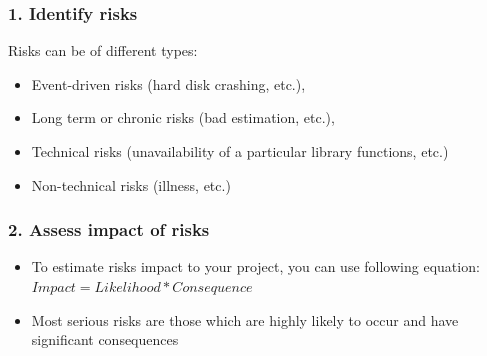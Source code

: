 \begin{frame}[t]\frametitle{1. Identify risks}
Risks can be of different types:
    \begin{itemize}
    	\item Event-driven risks (hard disk crashing, etc.),
        \item Long term or chronic risks (bad estimation, etc.),
        \item Technical risks (unavailability of a particular library functions, etc.)
        \item Non-technical risks (illness, etc.)
    \end{itemize}
\end{frame}

\begin{frame}[t]\frametitle{2. Assess impact of risks}
    \begin{itemize}
    	\item To estimate risks impact to your project, you can use following equation:
			$
			Impact = Likelihood * Consequence
			$
		\item Most serious risks are those which are highly likely to occur and have significant consequences

    \end{itemize}
\end{frame}

